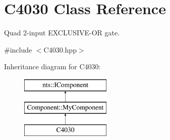 \hypertarget{classC4030}{}\section{C4030 Class Reference}
\label{classC4030}


Quad 2-\/input E\+X\+C\+L\+U\+S\+I\+V\+E-\/\+OR gate.  




{\ttfamily \#include $<$C4030.\+hpp$>$}

Inheritance diagram for C4030\+:\begin{figure}[H]
\begin{center}
\leavevmode
\includegraphics[height=3.000000cm]{classC4030}
\end{center}
\end{figure}
